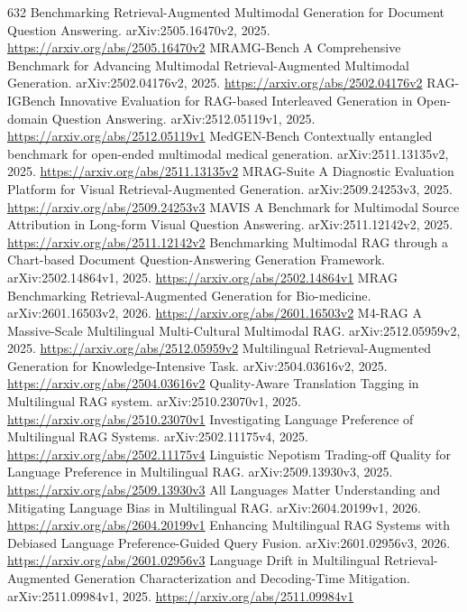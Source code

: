 \documentclass[11pt]{article}
\begin{document}
\begin{thebibliography}{632}
 Benchmarking Retrieval-Augmented Multimodal Generation for Document Question Answering. arXiv:2505.16470v2, 2025. \url{https://arxiv.org/abs/2505.16470v2}
 MRAMG-Bench A Comprehensive Benchmark for Advancing Multimodal Retrieval-Augmented Multimodal Generation. arXiv:2502.04176v2, 2025. \url{https://arxiv.org/abs/2502.04176v2}
 RAG-IGBench Innovative Evaluation for RAG-based Interleaved Generation in Open-domain Question Answering. arXiv:2512.05119v1, 2025. \url{https://arxiv.org/abs/2512.05119v1}
 MedGEN-Bench Contextually entangled benchmark for open-ended multimodal medical generation. arXiv:2511.13135v2, 2025. \url{https://arxiv.org/abs/2511.13135v2}
 MRAG-Suite A Diagnostic Evaluation Platform for Visual Retrieval-Augmented Generation. arXiv:2509.24253v3, 2025. \url{https://arxiv.org/abs/2509.24253v3}
 MAVIS A Benchmark for Multimodal Source Attribution in Long-form Visual Question Answering. arXiv:2511.12142v2, 2025. \url{https://arxiv.org/abs/2511.12142v2}
 Benchmarking Multimodal RAG through a Chart-based Document Question-Answering Generation Framework. arXiv:2502.14864v1, 2025. \url{https://arxiv.org/abs/2502.14864v1}
 MRAG Benchmarking Retrieval-Augmented Generation for Bio-medicine. arXiv:2601.16503v2, 2026. \url{https://arxiv.org/abs/2601.16503v2}
 M4-RAG A Massive-Scale Multilingual Multi-Cultural Multimodal RAG. arXiv:2512.05959v2, 2025. \url{https://arxiv.org/abs/2512.05959v2}
 Multilingual Retrieval-Augmented Generation for Knowledge-Intensive Task. arXiv:2504.03616v2, 2025. \url{https://arxiv.org/abs/2504.03616v2}
 Quality-Aware Translation Tagging in Multilingual RAG system. arXiv:2510.23070v1, 2025. \url{https://arxiv.org/abs/2510.23070v1}
 Investigating Language Preference of Multilingual RAG Systems. arXiv:2502.11175v4, 2025. \url{https://arxiv.org/abs/2502.11175v4}
 Linguistic Nepotism Trading-off Quality for Language Preference in Multilingual RAG. arXiv:2509.13930v3, 2025. \url{https://arxiv.org/abs/2509.13930v3}
 All Languages Matter Understanding and Mitigating Language Bias in Multilingual RAG. arXiv:2604.20199v1, 2026. \url{https://arxiv.org/abs/2604.20199v1}
 Enhancing Multilingual RAG Systems with Debiased Language Preference-Guided Query Fusion. arXiv:2601.02956v3, 2026. \url{https://arxiv.org/abs/2601.02956v3}
 Language Drift in Multilingual Retrieval-Augmented Generation Characterization and Decoding-Time Mitigation. arXiv:2511.09984v1, 2025. \url{https://arxiv.org/abs/2511.09984v1}

\end{thebibliography}
\end{document}
